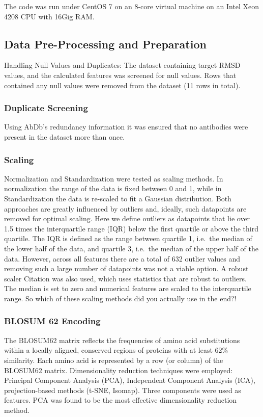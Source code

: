 \documentclass[12pt]{article}
\newcommand{\lilian}[1]{ {\color{red}{\bfseries Lilian:} #1}}
\begin{document}
The code was run under CentOS 7 on an 8-core virtual machine on an
Intel Xeon 4208 CPU with 16Gig RAM.

\subsection{Data Pre-Processing and Preparation}
Handling Null Values and Duplicates: The dataset containing target
RMSD values, and the calculated features was screened for null
values.
Rows that contained any null values were
removed from the dataset (11 rows in total).

\subsubsection{Duplicate Screening}
Using AbDb's redundancy information it was ensured that no antibodies
were present in the dataset more than once.

\subsubsection{Scaling}
Normalization and Standardization were tested as scaling methods. In normalization the range of the data is fixed between 0 and 1, while in Standardization the data is re-scaled to fit a Gaussian distribution. Both
approaches are greatly influenced by outliers and, ideally, such datapoints are
removed for optimal scaling. Here we define outliers as
datapoints that lie over 1.5 times the interquartile range (IQR) below
the first quartile or above the third quartile. The IQR is defined as
the range between quartile 1, i.e.\ the median of the lower half of the
data, and quartile 3, i.e.\ the median of the upper half of the
data. However, across all features there are a total of 632 outlier
values and removing such a large number of datapoints was not a viable
option. A robust scaler\cite{XXXX} \lilian{Citation} was also used, which uses statistics that are
robust to outliers. The median is set to zero and numerical features
are scaled to the interquartile range. \lilian{So which of these scaling methods did you actually use in the end?!}

\subsubsection{BLOSUM 62 Encoding}
The BLOSUM62 matrix reflects the frequencies of amino acid
substitutions within a locally aligned, conserved regions of proteins
with at least 62\% similarity. Each amino acid is represented by a row
(or column) of the BLOSUM62 matrix. Dimensionality reduction
techniques were employed: Principal Component Analysis (PCA),
Independent Component Analysis (ICA), projection-based methods (t-SNE,
Isomap). Three components were used as features. PCA was found to be the most effective dimensionality reduction method. 
\end{document}
